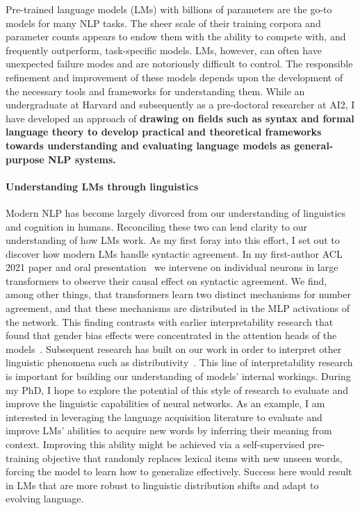 \documentclass[11pt]{article}
\begin{document}
Pre-trained language models (LMs) with billions of parameters 
are the go-to models for many NLP tasks.
The sheer scale of their training corpora and parameter counts
appears to endow them with the ability to compete with, 
and frequently outperform, task-specific models.
LMs, however, can often have unexpected failure modes 
and are notoriously difficult to control.
The responsible refinement and improvement of these models
depends upon the development of the necessary tools 
and frameworks for understanding them.
While an undergraduate at Harvard and subsequently as a pre-doctoral researcher 
at AI2, I have developed an approach of \textbf{
  drawing on fields such as syntax and formal language theory 
  to develop practical and theoretical frameworks  
  towards understanding and evaluating language models 
  as general-purpose NLP systems.
}

\paragraph{Understanding LMs through linguistics}

Modern NLP has become largely divorced 
from our understanding of linguistics and cognition in humans.
Reconciling these two can lend clarity to our understanding of how LMs work.
As my first foray into this effort, I set out to 
discover how modern LMs handle syntactic agreement.
In my first-author ACL 2021 paper and oral presentation~\cite{Finlayson2021CausalAO}
we intervene on individual neurons in large transformers 
to observe their causal effect on syntactic agreement.
We find, among other things, that transformers learn 
two distinct mechanisms for number agreement,
and that these mechanisms are distributed in the MLP activations of the network.
This finding contrasts with earlier interpretability research that found that 
gender bias effects were concentrated 
in the attention heads of the models~\cite{Vig2020InvestigatingGB}.
Subsequent research has built on our work 
in order to interpret other linguistic phenomena 
such as distributivity~\cite{Ban2022TestingPL}.
This line of interpretability research is important 
for building our understanding of models' internal workings.
During my PhD, I hope to explore the potential of this style of research
to evaluate and improve the linguistic capabilities of neural networks. 
As an example, I am interested in leveraging the language acquisition literature
to evaluate and improve LMs' abilities 
to acquire new words by inferring their meaning from context.
Improving this ability might be achieved via a self-supervised pre-training objective 
that randomly replaces lexical items with new unseen words, 
forcing the model to learn how to generalize effectively.
Success here would result in LMs that are 
more robust to linguistic distribution shifts
and adapt to evolving language.
\end{document}
